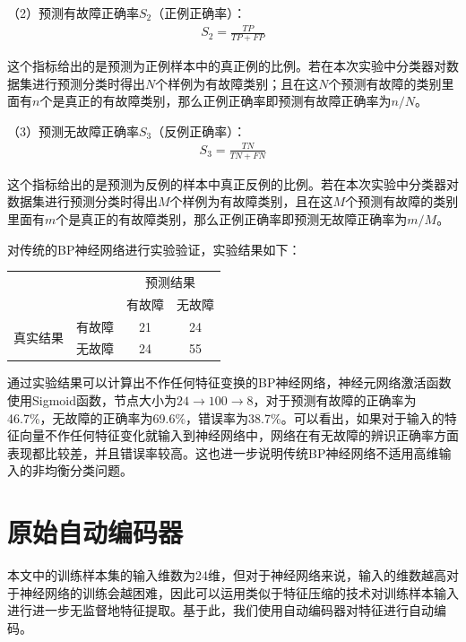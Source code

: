 \documentclass{ctacn}%
\begin{document}
\begin{multicols}{2}
（2）预测有故障正确率$S_2$（正例正确率）：
\begin{align}
S_2=\frac{TP}{TP+FP}
\end{align}

这个指标给出的是预测为正例样本中的真正例的比例。若在本次实验中分类器对数据集进行预测分类时得出$N$个样例为有故障类别；且在这$N$个预测有故障的类别里面有$n$个是真正的有故障类别，那么正例正确率即预测有故障正确率为$n/N$。

（3）预测无故障正确率$S_3$（反例正确率）：
\begin{align}
S_3=\frac{TN}{TN+FN}
\end{align}

这个指标给出的是预测为反例的样本中真正反例的比例。若在本次实验中分类器对数据集进行预测分类时得出$M$个样例为有故障类别，且在这$M$个预测有故障的类别里面有$m$个是真正的有故障类别，那么正例正确率即预测无故障正确率为$m/M$。

对传统的BP神经网络进行实验验证，实验结果如下：


\begin{center}
	\label{tab:3}
	\begin{tabular} {cccc}\toprule
		\multirow{2}{*}[-2pt]{}&\multirow{2}{*}[-2pt]{}&\multicolumn{2}{c}{预测结果}\\
		\cmidrule(lr){3-4}
		&&有故障&无故障\\\hline
		\multirow{2}{*}[-2pt]{真实结果}&有故障&21&24\\
		&无故障&24&55\\
		\bottomrule
\end{tabular}\end{center}

通过实验结果可以计算出不作任何特征变换的BP神经网络，神经元网络激活函数使用Sigmoid函数，节点大小为$24\rightarrow100\rightarrow8$，对于预测有故障的正确率为46.7\%，无故障的正确率为69.6\%，错误率为38.7\%。可以看出，如果对于输入的特征向量不作任何特征变化就输入到神经网络中，网络在有无故障的辨识正确率方面表现都比较差，并且错误率较高。这也进一步说明传统BP神经网络不适用高维输入的非均衡分类问题。

\section{原始自动编码器}

本文中的训练样本集的输入维数为24维，但对于神经网络来说，输入的维数越高对于神经网络的训练会越困难，因此可以运用类似于特征压缩的技术对训练样本输入进行进一步无监督地特征提取。基于此，我们使用自动编码器对特征进行自动编码。


\end{multicols}
\end{document}
